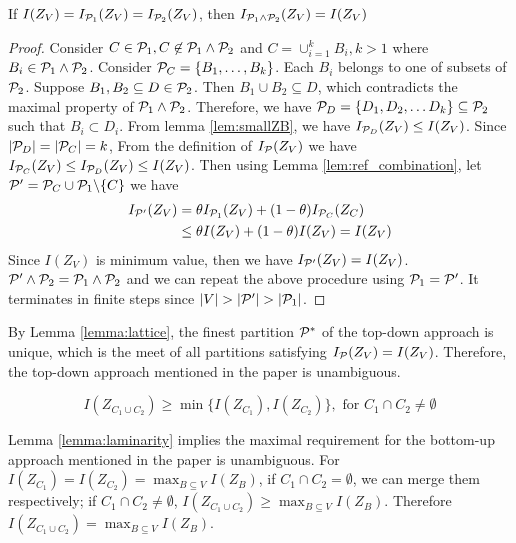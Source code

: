 \documentclass{article}
\begin{document}
\begin{lemma}\label{lemma:lattice}
If $I(Z_V) = I_{\P_1}(Z_V) = I_{\P_2}(Z_V)$, then $I_{\P_1 \wedge \P_2}(Z_V)=I(Z_V) $
\end{lemma}
\begin{proof}
Consider $C\in \P_1, C \not\in \P_1\wedge\P_2$ and $C = \cup_{i=1}^k B_i, k>1$ where $B_i \in \P_1 \wedge \P_2$.
Consider $\P_C = \{B_1, \dots, B_k\}$. Each $B_i$ belongs to one of subsets of $\P_2$. Suppose $B_1, B_2 \subseteq D \in \P_2$. Then $B_1\cup B_2 \subseteq D$,
which contradicts the maximal property of $\P_1\wedge \P_2$. Therefore, we have $\P_D = \{D_1, D_2, \dots D_k\}\subseteq \P_2$ such that $B_i \subset D_i$.
From lemma \ref{lem:smallZB}, we have $I_{\P_D}(Z_V) \leq I(Z_V)$. Since $\abs{\P_D} = \abs{\P_C}=k$, From the definition of $I_{\P}(Z_V)$ we have $I_{\P_C}(Z_V) \leq I_{\P_D}(Z_V) \leq I(Z_V)$.
Then using Lemma \ref{lem:ref_combination}, let $\P' = \P_C \cup \P_1\backslash \{C\}$ we have
\begin{align*}
	I_{\P'}(Z_V) & = \theta I_{\P_1}(Z_V) + (1-\theta) I_{\P_C}(Z_C) \\
	& \leq \theta I(Z_V) + (1- \theta)I(Z_V) = I(Z_V)
\end{align*} 
Since $I(Z_V)$ is minimum value, then we have $I_{\P'}(Z_V)=I(Z_V)$.
$\P'\wedge \P_2 = \P_1 \wedge \P_2$ and we can repeat the above procedure using $\P_1 = \P'$. It terminates in finite steps since $\abs{V} > \abs{\P'} > \abs{\P_1}$.
\end{proof}

By Lemma \ref{lemma:lattice}, the finest partition $\P^*$ of the top-down approach is unique, which is the meet of all partitions satisfying $I_{\P}(Z_V)=I(Z_V)$. Therefore, the top-down approach mentioned in the paper is unambiguous.

\begin{lemma}\label{lemma:laminarity}
\begin{equation}\label{eq:P}
I(Z_{C_1 \cup C_2}) \geq \min\{ I(Z_{C_1}), I(Z_{C_2})\}, \textrm{ for } C_1\cap C_2 \neq \emptyset
\end{equation}
\end{lemma}

Lemma \ref{lemma:laminarity} implies the maximal requirement for the bottom-up approach mentioned in the paper is unambiguous. For $I(Z_{C_1}) = I(Z_{C_2}) = \max_{B\subseteq V} I(Z_B)$, if $C_1 \cap C_2 = \emptyset$, we can merge them respectively; if $C_1\cap C_2 \neq \emptyset$, $I(Z_{C_1\cup C_2}) \geq \max_{B\subseteq V} I(Z_B)$. Therefore $I(Z_{C_1\cup C_2}) = \max_{B\subseteq V} I(Z_B)$.
\end{document}
